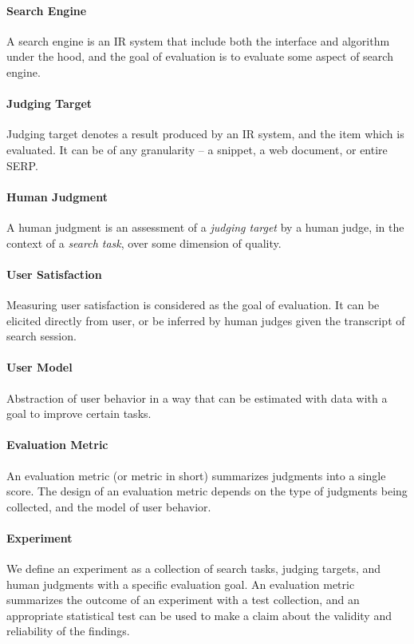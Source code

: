 \paragraph{Search Engine} A search engine is an IR system that include both the interface and algorithm under the hood, and the goal of evaluation is to evaluate some aspect of search engine.

\paragraph{Judging Target} Judging target denotes a result produced by an IR system, and the item which is evaluated. It can be of any granularity -- a snippet, a web document, or entire SERP. 

\paragraph{Human Judgment} A human judgment is an assessment of a \textit{judging target} by a human judge, in the context of a \textit{search task}, over some dimension of quality. 

\paragraph{User Satisfaction} Measuring user satisfaction is considered as the goal of evaluation. It can be elicited directly from user, or be inferred by human judges given the transcript of search session.

\paragraph{User Model}  Abstraction of user behavior in a way that can be estimated with data with a goal to improve certain tasks. 

\paragraph{Evaluation Metric} An evaluation metric (or metric in short) summarizes judgments into a single score. The design of an evaluation metric depends on the type of judgments being collected, and the model of user behavior.

\paragraph{Experiment} We define an experiment as a collection of search tasks, judging targets, and human judgments with a specific evaluation goal. An evaluation metric summarizes the outcome of an experiment with a test collection, and an appropriate statistical test can be used to make a claim about the validity and reliability of the findings.

